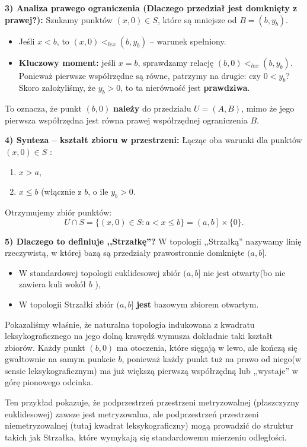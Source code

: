 \begin{eg}[1.2.10]
 \noindent \textbf{3) Analiza prawego ograniczenia (Dlaczego przedział jest domknięty z prawej?):} Szukamy punktów $\left( x,0 \right) \in S$, które są mniejsze od $B = \left( b, y_{b} \right) $.
 \begin{itemize}
 	\item Jeśli $x<b$, to $\left( x,0 \right) <_{lex} \left( b,y_{b} \right) $ -- warunek spełniony.
	\item \textbf{Kluczowy moment:}  jeśli $x = b$, sprawdzamy relację  $\left( b,0 \right) <_{lex} \left( b, y_{b} \right)$. Ponieważ pierwsze współrzędne są równe, patrzymy na drugie: czy $0 < y_{b}$? Skoro założyliśmy, że $y_{b} > 0$, to ta nierówność jest \textbf{prawdziwa}.
 \end{itemize}
 To oznacza, że punkt $\left( b,0 \right) $ \textbf{należy} do przedziału $U = \left( A,B \right) $, mimo że jego pierwsza współrzędna jest równa prawej współrzędnej ograniczenia $B$. 

\noindent \textbf{4) Synteza -- kształt zbioru w przestrzeni:} Łącząc oba warunki dla punktów $\left( x,0 \right) \in S$ :
\begin{enumerate}[label=\arabic*)]
	\item $x>a$,
	\item $x\le b$ (włącznie z $b$, o ile $y_{b}>0$.
\end{enumerate}
Otrzymujemy zbiór punktów:
\[
	U\cap S = \{\left( x,0 \right) \in S: a < x \le b\} = \left( a,b \right] \times \{0\}  
.\] 

\noindent \textbf{5) Dlaczego to definiuje ,,Strzałkę''?} W topologii ,,Strzałką'' nazywamy linię rzeczywistą, w której bazą są przedziały prawostronnie domknięte $(a,b]$.
 \begin{itemize}
	 \item W standardowej topologii euklidesowej zbiór $(a,b]$ nie jest otwarty(bo nie zawiera kuli wokół  $b$ ),
	 \item W topologii Strzałki zbiór $(a,b]$ \textbf{jest}  bazowym zbiorem otwartym.
\end{itemize}
Pokazaliśmy właśnie, że naturalna topologia indukowana z kwadratu leksykograficznego na jego dolną krawędź wymusza dokładnie taki kształt zbiorów. Każdy punkt $(b,0)$ ma otoczenia, które sięgają w lewo, ale kończą się gwałtownie na samym punkcie  $b$, ponieważ każdy punkt tuż na prawo od niego(w sensie leksykograficznym) ma już większą pierwszą współrzędną lub ,,wystaje'' w górę pionowego odcinka. 

Ten przykład pokazuje, że podprzestrzeń przestrzeni metryzowalnej (płaszczyzny euklidesowej) zawsze jest metryzowalna, ale podprzestrzeń przestrzeni niemetryzowalnej (tutaj kwadrat leksykograficzny) mogą prowadzić do struktur takich jak Strzałka, które wymykają się standardowemu mierzeniu odległości.
\end{eg} 

